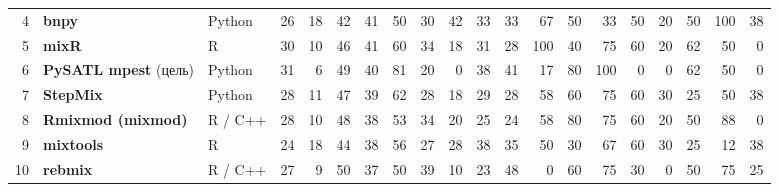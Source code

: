 \documentclass[10pt,a4paper]{article}
\begin{document}
\begin{landscape}
{\begin{longtable}{@{}r l l r r r r r r r *{10}{r}@{}}
4 & \textbf{bnpy} & Python & 26 & 18 & 42 & \cellcolor{hm!33}41 & \cellcolor{hm!40}50 & \cellcolor{hm!26}30 & \cellcolor{hm!35}42 & \cellcolor{hm!28}33 & \cellcolor{hm!28}33 & \cellcolor{hm!52}67 & \cellcolor{hm!40}50 & \cellcolor{hm!28}33 & \cellcolor{hm!40}50 & \cellcolor{hm!19}20 & \cellcolor{hm!40}50 & \cellcolor{hm!75}100 & \cellcolor{hm!31}38 \\
5 & \textbf{mixR} & R & 30 & 10 & 46 & \cellcolor{hm!33}41 & \cellcolor{hm!47}60 & \cellcolor{hm!29}34 & \cellcolor{hm!17}18 & \cellcolor{hm!27}31 & \cellcolor{hm!25}28 & \cellcolor{hm!75}100 & \cellcolor{hm!33}40 & \cellcolor{hm!58}75 & \cellcolor{hm!47}60 & \cellcolor{hm!19}20 & \cellcolor{hm!49}62 & \cellcolor{hm!40}50 & \cellcolor{hm!5}0 \\
6 & \textbf{PySATL mpest} (цель) & Python & 31 & 6 & 49 & \cellcolor{hm!33}40 & \cellcolor{hm!62}81 & \cellcolor{hm!19}20 & \cellcolor{hm!5}0 & \cellcolor{hm!31}38 & \cellcolor{hm!34}41 & \cellcolor{hm!17}17 & \cellcolor{hm!61}80 & \cellcolor{hm!75}100 & \cellcolor{hm!5}0 & \cellcolor{hm!5}0 & \cellcolor{hm!49}62 & \cellcolor{hm!40}50 & \cellcolor{hm!5}0 \\
7 & \textbf{StepMix} & Python & 28 & 11 & 47 & \cellcolor{hm!32}39 & \cellcolor{hm!48}62 & \cellcolor{hm!25}28 & \cellcolor{hm!17}18 & \cellcolor{hm!25}29 & \cellcolor{hm!25}28 & \cellcolor{hm!46}58 & \cellcolor{hm!47}60 & \cellcolor{hm!58}75 & \cellcolor{hm!47}60 & \cellcolor{hm!26}30 & \cellcolor{hm!22}25 & \cellcolor{hm!40}50 & \cellcolor{hm!31}38 \\
8 & \textbf{Rmixmod (mixmod)} & R / C++ & 28 & 10 & 48 & \cellcolor{hm!32}38 & \cellcolor{hm!42}53 & \cellcolor{hm!29}34 & \cellcolor{hm!19}20 & \cellcolor{hm!22}25 & \cellcolor{hm!22}24 & \cellcolor{hm!46}58 & \cellcolor{hm!61}80 & \cellcolor{hm!58}75 & \cellcolor{hm!47}60 & \cellcolor{hm!19}20 & \cellcolor{hm!40}50 & \cellcolor{hm!66}88 & \cellcolor{hm!5}0 \\
9 & \textbf{mixtools} & R & 24 & 18 & 44 & \cellcolor{hm!32}38 & \cellcolor{hm!44}56 & \cellcolor{hm!24}27 & \cellcolor{hm!24}28 & \cellcolor{hm!31}38 & \cellcolor{hm!29}35 & \cellcolor{hm!40}50 & \cellcolor{hm!26}30 & \cellcolor{hm!52}67 & \cellcolor{hm!47}60 & \cellcolor{hm!26}30 & \cellcolor{hm!22}25 & \cellcolor{hm!14}12 & \cellcolor{hm!31}38 \\
10 & \textbf{rebmix} & R / C++ & 27 & 9 & 50 & \cellcolor{hm!31}37 & \cellcolor{hm!40}50 & \cellcolor{hm!32}39 & \cellcolor{hm!12}10 & \cellcolor{hm!21}23 & \cellcolor{hm!38}48 & \cellcolor{hm!5}0 & \cellcolor{hm!47}60 & \cellcolor{hm!58}75 & \cellcolor{hm!26}30 & \cellcolor{hm!5}0 & \cellcolor{hm!40}50 & \cellcolor{hm!58}75 & \cellcolor{hm!22}25 \\

\end{longtable}}
\end{landscape}
\end{document}
